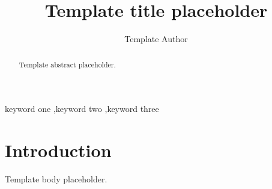 \documentclass[preprint,12pt]{elsarticle}
\begin{document}
\begin{frontmatter}

\title{Template title placeholder}

\author[aff1]{Template Author}

\begin{abstract}
Template abstract placeholder.
\end{abstract}

\begin{keyword}
keyword one \sep keyword two \sep keyword three
\end{keyword}

\end{frontmatter}

\section{Introduction}
Template body placeholder.



\end{document}
